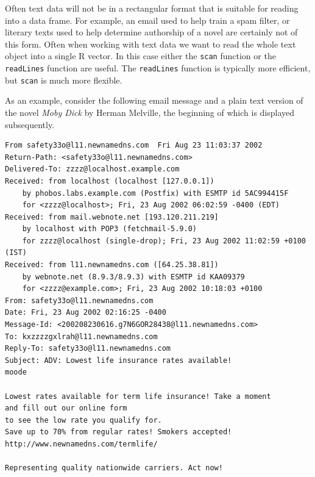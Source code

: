 \documentclass[
]{krantz}
\begin{document}
Often text data will not be in a rectangular format that is suitable for reading into a data frame. For example, an email used to help train a spam filter, or literary texts used to help determine authorship of a novel are certainly not of this form. Often when working with text data we want to read the whole text object into a single R vector. In this case either the \texttt{scan} function or the \texttt{readLines} function are useful. The \texttt{readLines} function is typically more efficient, but \texttt{scan} is much more flexible.

As an example, consider the following email message and a plain text version of the novel \emph{Moby Dick} by Herman Melville, the beginning of which is displayed subsequently.

\begin{verbatim}
From safety33o@l11.newnamedns.com  Fri Aug 23 11:03:37 2002
Return-Path: <safety33o@l11.newnamedns.com>
Delivered-To: zzzz@localhost.example.com
Received: from localhost (localhost [127.0.0.1])
	by phobos.labs.example.com (Postfix) with ESMTP id 5AC994415F
	for <zzzz@localhost>; Fri, 23 Aug 2002 06:02:59 -0400 (EDT)
Received: from mail.webnote.net [193.120.211.219]
	by localhost with POP3 (fetchmail-5.9.0)
	for zzzz@localhost (single-drop); Fri, 23 Aug 2002 11:02:59 +0100 (IST)
Received: from l11.newnamedns.com ([64.25.38.81])
	by webnote.net (8.9.3/8.9.3) with ESMTP id KAA09379
	for <zzzz@example.com>; Fri, 23 Aug 2002 10:18:03 +0100
From: safety33o@l11.newnamedns.com
Date: Fri, 23 Aug 2002 02:16:25 -0400
Message-Id: <200208230616.g7N6GOR28438@l11.newnamedns.com>
To: kxzzzzgxlrah@l11.newnamedns.com
Reply-To: safety33o@l11.newnamedns.com
Subject: ADV: Lowest life insurance rates available!                                                   
moode

Lowest rates available for term life insurance! Take a moment 
and fill out our online form 
to see the low rate you qualify for. 
Save up to 70% from regular rates! Smokers accepted! 
http://www.newnamedns.com/termlife/ 
          
Representing quality nationwide carriers. Act now!
\end{verbatim}
\end{document}
